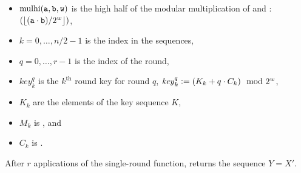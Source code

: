 \begin{itemize}
\begin{itemize}
  \item
  $\operatorname{mulhi}(\texttt{\protect a}, \texttt{\protect b}, \texttt{\protect w})$ is
  the high half of the modular multiplication of  and :
  $(\left\lfloor (\texttt{\protect a} \cdot \texttt{\protect b}) / 2^w \right\rfloor)$,

  \item
  $k = 0, \dotsc, n/2 - 1$ is the index in the sequences,

  \item
  $q = 0, \dotsc, r - 1$ is the index of the round,

  \item
  $\mathit{key}^q_k$ is the $k^\text{th}$ round key for round $q$,
  $\mathit{key}^q_k \mathrel{\mathop:}= (K_k + q \cdot C_k) \mod 2^w$,

  \item
  $K_k$ are the elements of the key sequence $K$,

  \item
  $M_k$ is , and

  \item
  $C_k$ is .
  \end{itemize}
\end{itemize}

\pnum
After $r$ applications of the single-round function,
 returns the sequence $Y = X'$.

